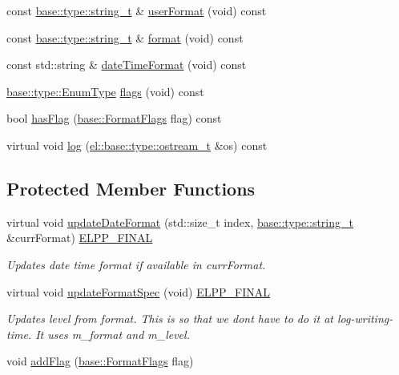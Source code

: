 \begin{DoxyCompactItemize}
\item 
const \hyperlink{namespaceel_1_1base_1_1type_a67e406cd213c231f1d135b5a4eda64b5}{base\+::type\+::string\+\_\+t} \& \hyperlink{classel_1_1base_1_1_log_format_a9ca6ecd5b9342653493670d5a4e230cd}{user\+Format} (void) const 
\item 
const \hyperlink{namespaceel_1_1base_1_1type_a67e406cd213c231f1d135b5a4eda64b5}{base\+::type\+::string\+\_\+t} \& \hyperlink{classel_1_1base_1_1_log_format_ac19602b3153daa9a76b56d3f4ff3beaa}{format} (void) const 
\item 
const std\+::string \& \hyperlink{classel_1_1base_1_1_log_format_aa06b2643592f8a441d93cde673640262}{date\+Time\+Format} (void) const 
\item 
\hyperlink{namespaceel_1_1base_1_1type_afb892a99b7545bf6e45c1e1d84af2ec9}{base\+::type\+::\+Enum\+Type} \hyperlink{classel_1_1base_1_1_log_format_a3ecf5f8df9b9e090784e19ad76046c49}{flags} (void) const 
\item 
bool \hyperlink{classel_1_1base_1_1_log_format_ae3634f9d90f7339d99eec8512b46c734}{has\+Flag} (\hyperlink{namespaceel_1_1base_a28939c5a884e67fcf12259f4b8848e00}{base\+::\+Format\+Flags} flag) const 
\item 
virtual void \hyperlink{classel_1_1base_1_1_log_format_a0cae595d1a367538243feb1be1555d2e}{log} (\hyperlink{namespaceel_1_1base_1_1type_a74ea109bf34d1c44926837fb0830f445}{el\+::base\+::type\+::ostream\+\_\+t} \&os) const 
\end{DoxyCompactItemize}
\subsection*{Protected Member Functions}
\begin{DoxyCompactItemize}
\item 
virtual void \hyperlink{classel_1_1base_1_1_log_format_a3146651eadd6b1164bde74e5b273ec94}{update\+Date\+Format} (std\+::size\+\_\+t index, \hyperlink{namespaceel_1_1base_1_1type_a67e406cd213c231f1d135b5a4eda64b5}{base\+::type\+::string\+\_\+t} \&curr\+Format) \hyperlink{easylogging_09_09_8h_a2f812449f8d3355cf5b03ceb2ee5021b}{E\+L\+P\+P\+\_\+\+F\+I\+N\+A\+L}
\begin{DoxyCompactList}\small\item\em Updates date time format if available in curr\+Format. \end{DoxyCompactList}\item 
virtual void \hyperlink{classel_1_1base_1_1_log_format_afee2335cce2b627dfd7f918d5a2b85f3}{update\+Format\+Spec} (void) \hyperlink{easylogging_09_09_8h_a2f812449f8d3355cf5b03ceb2ee5021b}{E\+L\+P\+P\+\_\+\+F\+I\+N\+A\+L}
\begin{DoxyCompactList}\small\item\em Updates level from format. This is so that we dont have to do it at log-\/writing-\/time. It uses m\+\_\+format and m\+\_\+level. \end{DoxyCompactList}\item 
void \hyperlink{classel_1_1base_1_1_log_format_ae55910f533a6eb3b41eb75b131e522bf}{add\+Flag} (\hyperlink{namespaceel_1_1base_a28939c5a884e67fcf12259f4b8848e00}{base\+::\+Format\+Flags} flag)
\end{DoxyCompactItemize}
